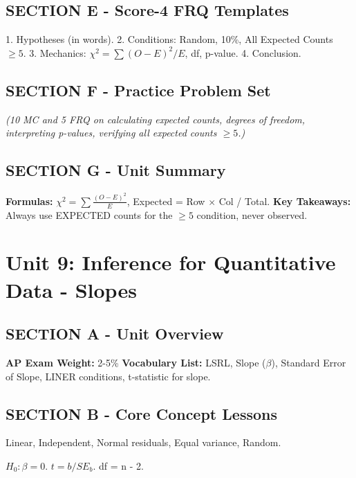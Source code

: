 \section{SECTION E - Score-4 FRQ Templates}
\begin{frqrubricbox}
1. Hypotheses (in words).
2. Conditions: Random, 10\%, All Expected Counts $\geq 5$.
3. Mechanics: $\chi^2 = \sum (O-E)^2/E$, df, p-value.
4. Conclusion.
\end{frqrubricbox}

\section{SECTION F - Practice Problem Set}
\begin{workbookbox}
\textit{(10 MC and 5 FRQ on calculating expected counts, degrees of freedom, interpreting p-values, verifying all expected counts $\ge 5$.)}
\end{workbookbox}

\section{SECTION G - Unit Summary}
\begin{lessonbox}
\textbf{Formulas:} $\chi^2 = \sum \frac{(O-E)^2}{E}$, Expected = Row $\times$ Col / Total.
\textbf{Key Takeaways:} Always use EXPECTED counts for the $\ge 5$ condition, never observed.
\end{lessonbox}

\chapter{Unit 9: Inference for Quantitative Data - Slopes}
\section{SECTION A - Unit Overview}
\textbf{AP Exam Weight:} 2-5\%
\textbf{Vocabulary List:} LSRL, Slope ($\beta$), Standard Error of Slope, LINER conditions, t-statistic for slope.

\section{SECTION B - Core Concept Lessons}
\begin{lessonbox}
Linear, Independent, Normal residuals, Equal variance, Random.
\end{lessonbox}
\begin{lessonbox}
$H_0: \beta = 0$. $t = b / SE_b$. df = n - 2.
\end{lessonbox}

